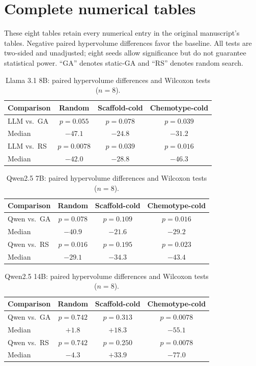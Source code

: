 \section{Complete numerical tables}
\label{app:tables}
These eight tables retain every numerical entry in the original manuscript's tables. Negative paired hypervolume differences favor the baseline. All tests are two-sided and unadjusted; eight seeds allow significance but do not guarantee statistical power. ``GA'' denotes static-GA and ``RS'' denotes random search.

\begin{table}[htbp]
\caption{Llama 3.1 8B: paired hypervolume differences and Wilcoxon tests ($n=8$).}
\label{tab:original-1}
\centering
\begin{tabular}{@{}lccc@{}}
\toprule
Comparison & Random & Scaffold-cold & Chemotype-cold \\
\midrule
LLM vs.\ GA & $p=0.055$ & $p=0.078$ & $p=0.039$ \\
Median & $-47.1$ & $-24.8$ & $-31.2$ \\
LLM vs.\ RS & $p=0.0078$ & $p=0.039$ & $p=0.016$ \\
Median & $-42.0$ & $-28.8$ & $-46.3$ \\
\bottomrule
\end{tabular}
\end{table}

\begin{table}[htbp]
\caption{Qwen2.5 7B: paired hypervolume differences and Wilcoxon tests ($n=8$).}
\label{tab:original-2}
\centering
\begin{tabular}{@{}lccc@{}}
\toprule
Comparison & Random & Scaffold-cold & Chemotype-cold \\
\midrule
Qwen vs.\ GA & $p=0.078$ & $p=0.109$ & $p=0.016$ \\
Median & $-40.9$ & $-21.6$ & $-29.2$ \\
Qwen vs.\ RS & $p=0.016$ & $p=0.195$ & $p=0.023$ \\
Median & $-29.1$ & $-34.3$ & $-43.4$ \\
\bottomrule
\end{tabular}
\end{table}

\begin{table}[htbp]
\caption{Qwen2.5 14B: paired hypervolume differences and Wilcoxon tests ($n=8$).}
\label{tab:original-3}
\centering
\begin{tabular}{@{}lccc@{}}
\toprule
Comparison & Random & Scaffold-cold & Chemotype-cold \\
\midrule
Qwen vs.\ GA & $p=0.742$ & $p=0.313$ & $p=0.0078$ \\
Median & $+1.8$ & $+18.3$ & $-55.1$ \\
Qwen vs.\ RS & $p=0.742$ & $p=0.250$ & $p=0.0078$ \\
Median & $-4.3$ & $+33.9$ & $-77.0$ \\
\bottomrule
\end{tabular}
\end{table}


